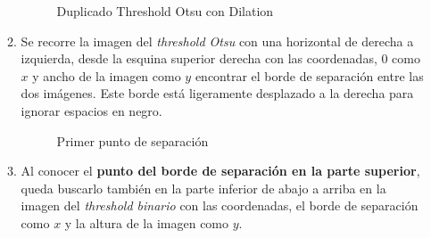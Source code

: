\begin{enumerate}
\begin{enumerate}[label*=\arabic*.]
    \begin{figure}[H]
      \caption{Duplicado Threshold Otsu con Dilation}
      \centering \setlength\fboxsep{0pt} \setlength\fboxrule{0.5pt}
    \end{figure}

  \item Se recorre la imagen del \emph{threshold Otsu} con una
    horizontal de derecha a izquierda, desde la esquina superior
    derecha con las coordenadas, $0$ como $x$ y ancho de la imagen
    como $y$ encontrar el borde de separación entre las dos imágenes.
    Este borde está ligeramente desplazado a la derecha para ignorar
    espacios en negro.

    \begin{figure}[H]
      \caption{Primer punto de separación}
      \centering \setlength\fboxsep{0pt} \setlength\fboxrule{0.5pt}
    \end{figure}

  \item Al conocer el \textbf{punto del borde de separación en la
      parte superior}, queda buscarlo también en la parte inferior de
    abajo a arriba en la imagen del \emph{threshold binario} con las
    coordenadas, el borde de separación como $x$ y la altura de la
    imagen como $y$.


\end{enumerate}
\end{enumerate}
